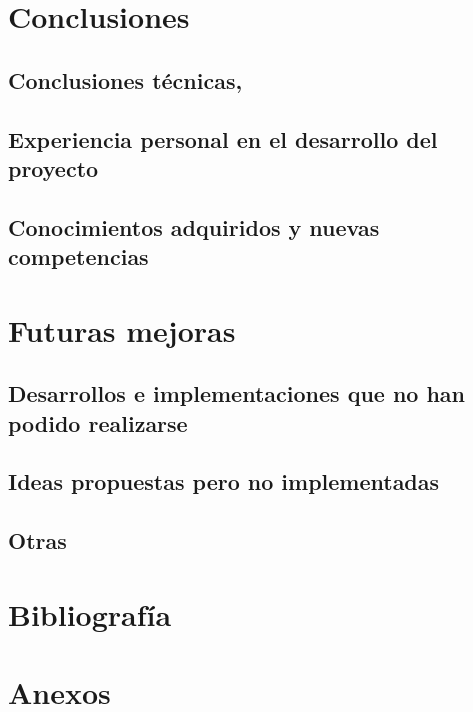 \chapter{Conclusiones}
\section{Conclusiones técnicas,}
\section{Experiencia personal en el desarrollo del proyecto}
\section{Conocimientos adquiridos y nuevas competencias}
\chapter{Futuras mejoras}
\section{Desarrollos e implementaciones que no han podido realizarse}
\section{Ideas propuestas pero no implementadas}
\section{Otras}
\chapter{Bibliografía}
\chapter{Anexos}